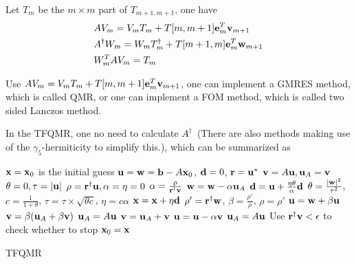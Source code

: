 Let $T_m$ be the $m\times m$ part of $T_{m+1,m+1}$, one have
\begin{equation}
\begin{split}
&AV_m=V_mT_m+T[m,m+1]{\bf e}_m^T {\bf v}_{m+1}\\
&A^{\dagger}W_m=W_mT_m^{\dagger}+T[m+1,m]{\bf e}_m^T {\bf w}_{m+1}\\
&W_m^{T}AV_m=T_m\\
\end{split}
\end{equation}

Use $AV_m=V_mT_m+T[m,m+1]{\bf e}_m^T {\bf v}_{m+1}$, one can implement a GMRES method, which is called QMR, or one can implement a FOM method, which is called two sided Lanczos method.

In the TFQMR, one no need to calculate $A^{\dagger}$~(There are also methods making use of the $\gamma _5$-hermiticity to simplify this.), which can be summarized as
\begin{algorithm}[H]
\begin{algorithmic}
\State ${\bf x}={\bf x}_0$ is the initial guess
    \State ${\bf u}={\bf w}={\bf b}-A{\bf x}_0$, ${\bf d}=0$, ${\bf r}={\bf u}^*$
    \State ${\bf v}=A {\bf u}, {\bf u}_A= {\bf v}$
    \State $\theta=0, \tau = |{\bf u}|$
    \State $\rho = {\bf r}^{\dagger} {\bf u}, \alpha=\eta = 0$
            \State $\alpha = \frac{\rho}{{\bf r}^{\dagger} {\bf v}}$
        \EndIf
        \State ${\bf w}={\bf w}-\alpha {\bf u}_A$
        \State ${\bf d}={\bf u}+\frac{\eta \theta}{\alpha}{\bf d}$
        \State $\theta = \frac{|{\bf w}|^2}{\tau ^2}$, $c=\frac{1}{1+\theta}$, $\tau=\tau \times \sqrt{\theta c}$, $\eta = c\alpha$
        \State ${\bf x}={\bf x}+\eta {\bf d}$
            \State $\rho ' = {\bf r}^{\dagger} {\bf w}$, $\beta = \frac{\rho '}{\rho}$, $\rho = \rho '$
            \State ${\bf u}={\bf w}+\beta {\bf u}$
            \State ${\bf v}=\beta ({\bf u}_A + \beta {\bf v})$
            \State ${\bf u}_A = A {\bf u}$
            \State ${\bf v}={\bf u}_A + {\bf v}$
        \Else
            \State ${\bf u}={\bf u} - \alpha {\bf v}$
            \State ${\bf u}_A = A {\bf u}$
        \EndIf
        \State Use ${\bf r}^{\dagger}{\bf v}<\epsilon$ to check whether to stop
    \EndFor
    \State ${\bf x}_0={\bf x}$
\EndFor
\end{algorithmic}
\caption{\label{alg.TFQMR}TFQMR}
\end{algorithm}
